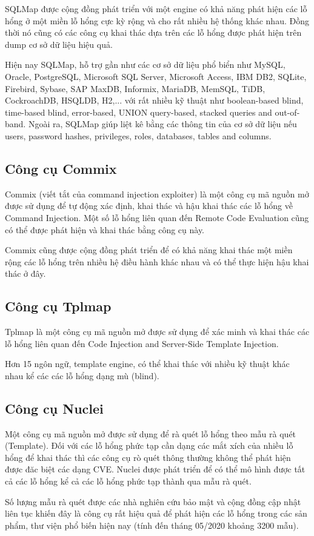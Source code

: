 \documentclass[./../main.tex]{subfiles}
\begin{document}
SQLMap được cộng đồng phát triển với một engine có khả năng phát hiện các
lỗ hổng ở một miền lỗ hổng cực kỳ rộng và cho rất nhiều hệ thống khác nhau.
Đồng thời nó cũng có các công cụ khai thác dựa trên các lỗ hổng được phát
hiện trên dump cơ sở dữ liệu hiệu quả.

Hiện nay SQLMap, hỗ trợ gần như các cơ sở dữ liệu phổ biển như MySQL,
Oracle, PostgreSQL, Microsoft SQL Server, Microsoft Access, IBM DB2,
SQLite, Firebird, Sybase, SAP MaxDB, Informix, MariaDB, MemSQL, TiDB,
CockroachDB, HSQLDB, H2,... với rất nhiều kỹ thuật như boolean-based blind,
time-based blind, error-based, UNION query-based, stacked queries and
out-of-band. Ngoài ra, SQLMap giúp liệt kê bằng các thông tin của cơ
sở dữ liệu nếu users, password hashes, privileges, roles, databases,
tables and columns.

\subsection{Công cụ Commix}
Commix (viết tắt của command injection exploiter) là một công cụ mã nguồn
mở được sử dụng để tự động xác định, khai thác và hậu khai thác các lỗ
hổng về Command Injection. Một số lỗ hổng liên quan đến
Remote Code Evaluation cũng có thể được phát hiện và khai thác bằng công
cụ này.

Commix cũng được cộng đồng phát triển để có khả năng khai
thác một miền rộng các lỗ hổng trên nhiều hệ điều hành khác nhau
và có thể thực hiện hậu khai thác ở đây.
\subsection{Công cụ Tplmap}
Tplmap là một công cụ mã nguồn mở được sử dụng để xác minh và khai
thác các lỗ hổng liên quan đến Code Injection and Server-Side Template
Injection.


Hơn 15 ngôn ngữ, template engine, có thể khai thác với nhiều kỹ thuật
khác nhau kể các các lỗ hổng dạng mù (blind).

\subsection{Công cụ Nuclei}
Một công cụ mã nguồn mở được sử dụng để rà quét lỗ hổng theo mẫu rà quét (Template).
Đối với các lỗ hổng phức tạp cần dạng các mắt xích của nhiều lỗ hổng để
khai thác thì các công cụ rò quét thông thường không thể phát hiện được đăc biệt
các dạng CVE. Nuclei được phát triển để có thể mô hình được tất cả các lỗ
hổng kể cả các lỗ hổng phức tạp thành qua mẫu rà quét.

Số lượng mẫu rà quét được các nhà nghiên cứu bảo mật và cộng đồng cập nhật liên tục
khiến đây là công cụ rất hiệu quả để phát hiện các lỗ hổng trong các sản phẩm,
thư viện phổ biến hiện nay (tính đến tháng 05/2020 khoảng 3200 mẫu).
\end{document}
